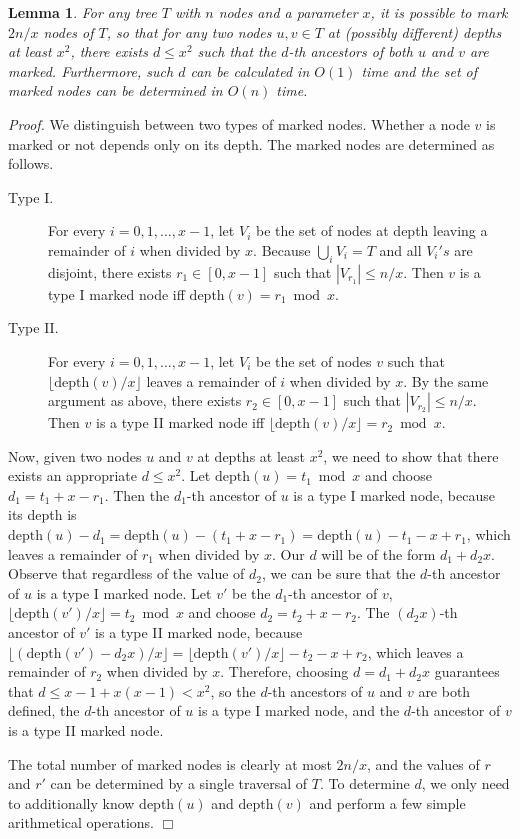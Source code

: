 \documentclass [10pt]{article}
\newtheorem{lemma}{Lemma}
\newcommand{\qed}{\hfill\ensuremath{\Box}\medskip\\\noindent}
\newenvironment{proof}{\noindent\emph{Proof. }}{}
\newcommand{\depth}{\ensuremath{\mathrm{depth}}}
\begin{document}
\begin{lemma}\label{lem:difference}
For any tree $T$ with $n$ nodes and a parameter $x$, it is possible to mark $2n/x$ nodes of $T$, so that for any two nodes $u,v\in T$
at (possibly different) depths at least $x^{2}$, there exists $d\leq x^{2}$ such that the $d$-th ancestors of both $u$ and $v$
are marked. Furthermore, such $d$ can be calculated in $O(1)$ time and the set of marked nodes can be determined in $O(n)$ time.
\end{lemma}

\begin{proof}
We distinguish between two types of marked nodes. Whether a node $v$ is marked or not depends only on its depth.
The marked nodes are determined as follows.

\begin{description}
\item[Type I.] For every $i=0,1,\ldots,x-1$, let $V_{i}$ be the set of nodes at depth leaving a remainder of $i$ when divided by $x$. Because
$\bigcup_{i}V_{i}=T$ and all $V_{i}'s$ are disjoint, there exists $r_{1}\in [0,x-1]$ such that $|V_{r_{1}}|\leq n/x$. Then $v$ is a type I marked node
iff $\depth(v) = r_{1}  \bmod x$.
\item[Type II.]  For every $i=0,1,\ldots,x-1$, let $V_{i}$ be the set of nodes $v$ such that $\lfloor \depth(v)/x \rfloor$ leaves a remainder
of $i$ when divided by $x$. By the same argument as above, there exists $r_{2}\in [0,x-1]$ such that $|V_{r_{2}}|\leq n/x$. Then $v$ is a type II marked
node iff $\lfloor \depth(v)/x \rfloor = r_{2}  \bmod x$.
\end{description}

Now, given two nodes $u$ and $v$ at depths at least $x^{2}$, we need to show that there exists an appropriate $d\leq x^{2}$. Let
$\depth(u)=t_{1} \bmod x$ and choose $d_{1}=t_{1}+x-r_{1}$. Then the $d_{1}$-th ancestor of $u$ is a type I marked node, because
its depth is $\depth(u)-d_{1}=\depth(u)-(t_{1}+x-r_{1})=\depth(u)-t_{1}-x+r_{1}$, which leaves a remainder of $r_{1}$ when divided by $x$.
Our $d$ will be of the form $d_{1}+d_{2}x$. Observe that regardless of the value of $d_{2}$, we can be sure that the $d$-th ancestor
of $u$ is a type I marked node. Let $v'$ be the $d_{1}$-th ancestor of $v$, $\lfloor \depth(v')/x \rfloor = t_{2} \bmod x$ and choose
$d_{2}=t_{2}+x-r_{2}$. The $(d_{2}x)$-th ancestor of $v'$ is a type II marked node, because
$\lfloor (\depth(v')-d_{2}x)/x \rfloor = \lfloor \depth(v')/x\rfloor -t_{2}-x+r_{2}$, which leaves a remainder of $r_{2}$ when divided by $x$.
Therefore, choosing $d=d_{1}+d_{2}x$ guarantees that $d\leq x-1+x(x-1)<x^{2}$, so the $d$-th ancestors of $u$ and $v$ are both
defined, the $d$-th ancestor of $u$ is a type I marked node, and the $d$-th ancestor of $v$ is a type II marked node.

The total number of marked nodes is clearly at most $2n/x$, and the values of $r$ and $r'$ can be determined by a single traversal of $T$.
To determine $d$, we only need to additionally know $\depth(u)$ and $\depth(v)$ and perform a few simple arithmetical operations.
\qed
\end{proof}
\end{document}
